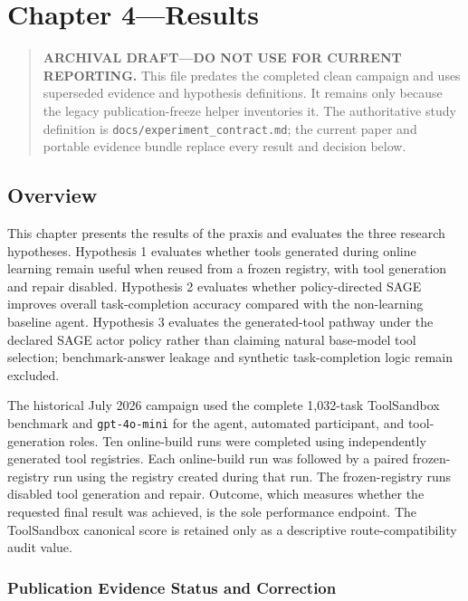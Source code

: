 \chapter{Chapter 4---Results}
\label{ch:results}

\begin{quote}
\textbf{ARCHIVAL DRAFT---DO NOT USE FOR CURRENT REPORTING.}
This file predates the completed clean campaign and uses superseded evidence
and hypothesis definitions. It remains only because the legacy
publication-freeze helper inventories it. The authoritative study definition
is \texttt{docs/experiment\_contract.md}; the current paper and portable
evidence bundle replace every result and decision below.
\end{quote}

\section{Overview}
\label{subsec:overview}

This chapter presents the results of the praxis and evaluates the three research hypotheses. Hypothesis 1 evaluates whether tools generated during online learning remain useful when reused from a frozen registry, with tool generation and repair disabled. Hypothesis 2 evaluates whether policy-directed SAGE improves overall task-completion accuracy compared with the non-learning baseline agent. Hypothesis 3 evaluates the generated-tool pathway under the declared SAGE actor policy rather than claiming natural base-model tool selection; benchmark-answer leakage and synthetic task-completion logic remain excluded.

The historical July 2026 campaign used the complete 1,032-task ToolSandbox benchmark and
\texttt{gpt-4o-mini} for the agent, automated participant, and tool-generation roles. Ten online-build runs were completed using independently generated tool registries. Each online-build run was followed by a paired frozen-registry run using the registry created during that run. The frozen-registry runs disabled tool generation and repair. Outcome, which measures whether the requested final result was achieved, is the sole performance endpoint. The ToolSandbox canonical score is retained only as a descriptive route-compatibility audit value.

\subsection{Publication Evidence Status and Correction}
\label{subsec:chapter4-publication-correction}

